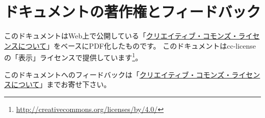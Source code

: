 \documentclass{ltjsarticle}
\begin{document}
\nocite{Book:CCJP}\nocite{Book:NAWA-CR2}\nocite{Book:NOGUCHI-COPY}\nocite{Book:CHEN-FC}
\printbibliography[title=参考図書]


\section*{ドキュメントの著作権とフィードバック}

このドキュメントはWeb上で公開している「\href{http://www.baldanders.info/cc-license.shtml#aboutCC}{クリエイティブ・コモンズ・ライセンスについて}」をベースにPDF化したものです。
このドキュメントはcc-licenseの「表示」ライセンスで提供しています\footnote{\url{http://creativecommons.org/licenses/by/4.0/}}。

このドキュメントへのフィードバックは「\href{http://www.baldanders.info/cc-license.shtml#aboutCC}{クリエイティブ・コモンズ・ライセンスについて}」までお寄せ下さい。
\end{document}
